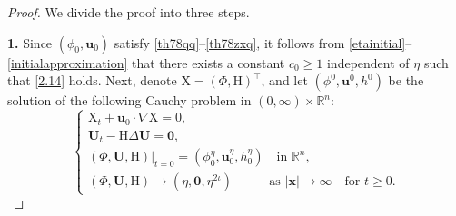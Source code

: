 \documentclass[10pt,a4paper]{amsart}
\begin{document}
\begin{proof}
We divide the proof into three steps.  

\smallskip
\textbf{1.} Since $(\phi_0,\boldsymbol{u}_0)$ satisfy \eqref{th78qq}--\eqref{th78zxq}, it follows from  \eqref{etainitial}--\eqref{initialapproximation} that  there exists a constant $c_0\geq 1$ independent of $\eta$ such that \eqref{2.14} holds. Next, denote $\mathrm{X}=(\Phi,\mathrm{H})^\top$, and  let $(\phi^0,\boldsymbol{u}^0,h^0)$ be the solution of the following Cauchy problem in $(0,\infty)\times\mathbb{R}^n$:
\begin{equation*} 
\begin{cases}
\displaystyle \mathrm{X}_t+\boldsymbol{u}_0\cdot \nabla \mathrm{X}=0, \\
\mathbf{U}_t-\mathrm{H}\Delta \mathbf{U}=\boldsymbol{0}, \\
(\Phi,\mathbf{U},\mathrm{H})|_{t=0}=(\phi^\eta_0,\boldsymbol{u}^\eta_0,h^\eta_0)\quad \text{in $\mathbb{R}^n$},\\
(\Phi,\mathbf{U},\mathrm{H})\to (\eta,\boldsymbol{0},\eta^{2\iota}) \quad \quad  \ \ \ \ \text{as $|\boldsymbol{x}|\to \infty$} \quad \text{for $t\geq 0$}.
\end{cases}
\end{equation*}


\end{proof}
\end{document}

